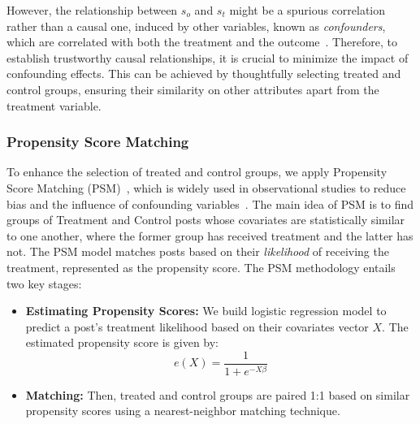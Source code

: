 However, the relationship between $s_o$ and $s_t$ might be a spurious correlation rather than a causal one, induced by other variables, known as \textit{confounders}, which are correlated with both the treatment and the outcome~\cite{Feder2022Causal}. Therefore, to establish trustworthy causal relationships, it is crucial to minimize the impact of confounding effects. This can be achieved by thoughtfully selecting treated and control groups, ensuring their similarity on other attributes apart from the treatment variable.

\subsubsection{Propensity Score Matching}
\label{sec:psm}
To enhance the selection of treated and control groups, we apply Propensity Score Matching (PSM)~\cite{Rosenbaum1983TheCR}, which is widely used in observational studies to reduce bias and the influence of confounding variables~\cite{imbens_rubin_2015}. 
The main idea of PSM is to find groups of Treatment and Control posts whose covariates are statistically similar to one another, where the former group has received treatment and the latter has not. 
The PSM model matches posts based on their \textit{likelihood} of receiving the treatment, represented as the propensity score.
The PSM methodology entails two key stages:
\begin{itemize}
    \item \textbf{Estimating Propensity Scores:} We build logistic regression model to predict a post's treatment likelihood based on their covariates vector $X$. The estimated propensity score is given by: $$e(X) = \frac{1}{1 + e^{-X\beta}}$$
    \item \textbf{Matching:} Then, treated and control groups are paired 1:1 based on similar propensity scores using a nearest-neighbor matching technique.
\end{itemize}

